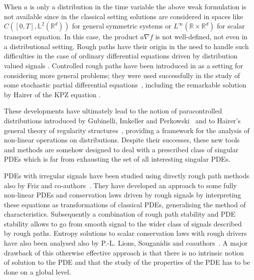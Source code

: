\documentclass[11pt,a4paper]{amsart}
\newcommand{\RR}{\mathbb{R}}  \newcommand{\CC}{\mathbb{C}}  \newcommand{\LL}{\mathbb{L}}  \newcommand{\WW}{\mathbb{W}}
\newcommand{\ssk}{\smallskip}
\numberwithin{equation}{section} %
\begin{document}
When $a$ is only a distribution in the time variable the above weak formulation is not available since in the classical setting solutions are considered in spaces like $C([0,T],\LL^2(\RR^d))$ for general symmetric systems  or $L^\infty(\RR\times \RR^d)$ for scalar transport equation. In this case, the product $a\nabla f$ is not well-defined, not even in a distributional setting. Rough paths have their origin in the need to handle such difficulties in the case of ordinary differential equations driven by distribution valued signals \cite{Lyons98,Lyons2002,Lyons2007,Friz2010}. Controlled rough paths have been introduced in \cite{Gubinelli04} as a setting for considering more general problems; they were used successfully in the study of some stochastic partial differential equations~\cite{Bessaih2005,GT,Deya2012,Hairer2011,Gubinelli2012a,Hairer2012,Hairer2013},  including the remarkable solution by Hairer of the KPZ equation \cite{HairerKPZ}. 

\ssk

These developments have ultimately lead to the notion of paracontrolled distributions introduced by Gubinelli, Imkeller and Perkowski~\cite{GIP} and to Hairer's general theory of regularity structures~\cite{HairerRegularity},  providing a  framework for the analysis of non-linear operations on distributions. Despite their successes, these new tools and methods are somehow designed to deal with a prescribed class of singular PDEs which is far from exhausting the set of all interesting singular PDEs. 

\ssk

PDEs with irregular signals have been studied using directly rough path methods also by Friz and co-authors~\cite{Caruana2009, CaruanaFrizOberhauser, FrizOberhauser1, FrizOberhauser2, FrizGess}. They have developed an approach to some  fully non-linear PDEs and conservation laws driven by rough signals by interpreting these equations  as transformations of classical PDEs, generalising the method of characteristics. Subsequently a combination of rough path stability and PDE stability allows to go from smooth signal to the wider class of signals described by rough paths. Entropy solutions to scalar conservation laws with rough drivers have also been analysed also by P.-L. Lions, Souganidis and coauthors~\cite{LionsPerthameSouganidis1,LionsPerthameSouganidis2, GessSouganidis}. A major drawback of this otherwise effective approach is that there is no intrinsic notion of solution to the PDE and that the study of the properties of the PDE has to be done on a global level.
\end{document}
